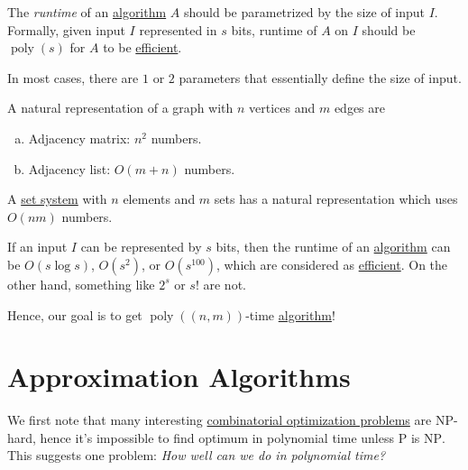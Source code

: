 \begin{remark}
	The \emph{runtime} of an \hyperref[def:algorithm]{algorithm} \(A\) should be parametrized by the size of input \(I\). Formally, given input \(I\) represented in \(s\) bits, runtime of \(A\) on \(I\) should be \(\mathop{\mathrm{poly}}(s)\) for \(A\) to be \hyperref[def:efficient]{efficient}.
\end{remark}

\begin{note}
	In most cases, there are \(1\) or \(2\) parameters that essentially define the size of input.

	\begin{eg}[Graph]
		A natural representation of a graph with \(n\) vertices and \(m\) edges are
		\begin{enumerate}[(a)]
			\item Adjacency matrix: \(n ^{2} \) numbers.
			\item Adjacency list: \(O(m+n)\) numbers.
		\end{enumerate}
	\end{eg}

	\begin{eg}
		A \hyperref[def:set-system]{set system} with \(n\) elements and \(m\) sets has a natural representation which uses \(O(nm)\) numbers.
	\end{eg}
\end{note}

\begin{eg}
	If an input \(I\) can be represented by \(s\) bits, then the runtime of an \hyperref[def:algorithm]{algorithm} can be \(O(s \log s)\), \(O(s ^{2} )\), or \(O(s^{100} )\), which are considered as \hyperref[def:efficient]{efficient}. On the other hand, something like \(2^s\) or \(s!\) are not.
\end{eg}

Hence, our goal is to get \(\mathop{\mathrm{poly}}((n, m))\)-time \hyperref[def:algorithm]{algorithm}!

\section{Approximation Algorithms}

We first note that many interesting \hyperref[def:combinatorial-optimization]{combinatorial optimization problems} are \textsc{NP}-hard, hence it's impossible to find optimum in polynomial time unless \textsc{P} is \textsc{NP}. This suggests one problem: \emph{How well can we do in polynomial time?}

